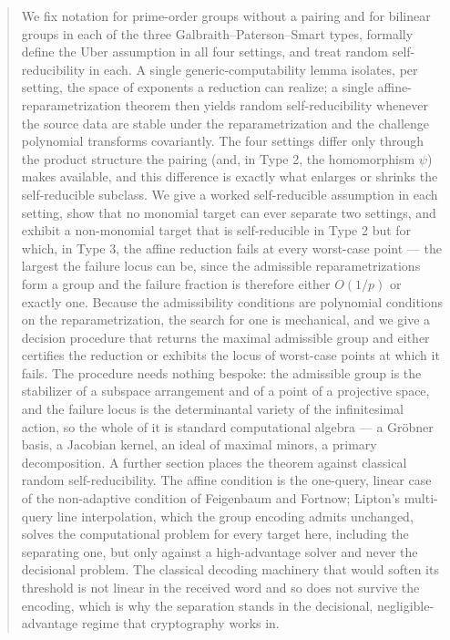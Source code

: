 \documentclass{aicr-solution}
\begin{document}

\vspace{0.6em}

\begin{abstract}
We fix notation for prime-order groups without a pairing and for bilinear groups in each
of the three Galbraith--Paterson--Smart types, formally define the Uber assumption in all
four settings, and treat random self-reducibility in each. A single generic-computability
lemma isolates, per setting, the space of exponents a reduction can realize; a single
affine-reparametrization theorem then yields random self-reducibility whenever the source
data are stable under the reparametrization and the challenge polynomial transforms
covariantly. The four settings differ only through the product structure the pairing (and,
in Type 2, the homomorphism $\psi$) makes available, and this difference is exactly what
enlarges or shrinks the self-reducible subclass. We give a worked self-reducible assumption in
each setting, show that no monomial target can ever separate two settings, and exhibit a
non-monomial target that is self-reducible in Type 2 but for which, in Type 3, the affine
reduction fails at every worst-case point --- the largest the failure locus can be, since the
admissible reparametrizations form a group and the failure fraction is therefore either
$O(1/p)$ or exactly one. Because the admissibility conditions are polynomial conditions on the
reparametrization, the search for one is mechanical, and we give a decision procedure that
returns the maximal admissible group and either certifies the reduction or exhibits the locus
of worst-case points at which it fails. The procedure needs nothing bespoke: the admissible
group is the stabilizer of a subspace arrangement and of a point of a projective space, and the
failure locus is the determinantal variety of the infinitesimal action, so the whole of it is
standard computational algebra --- a Gr\"obner basis, a Jacobian kernel, an ideal of maximal
minors, a primary decomposition. A further section places the theorem against classical
random
self-reducibility. The affine condition is the one-query, linear case of the non-adaptive
condition of Feigenbaum and Fortnow; Lipton's multi-query line interpolation, which the group
encoding admits unchanged, solves the computational problem for every target here, including
the separating one, but only against a high-advantage solver and never the decisional problem.
The classical decoding machinery that would soften its threshold is not linear in the received
word and so does not survive the encoding, which is why the separation stands in the
decisional, negligible-advantage regime that cryptography works in.
\end{abstract}
\end{document}
